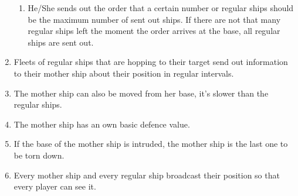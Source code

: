 \begin{enumerate}
\begin{enumerate}[label=\alph*)]
			\item He/She sends out the order that a certain number or regular ships should be the maximum number of sent out ships. If there are not that many regular ships left the moment the order arrives at the base, all regular ships are sent out.
		\end{enumerate}
	\item Fleets of regular ships that are hopping to their target send out information to their mother ship about their position in regular intervals.
	\item The mother ship can also be moved from her base, it's slower than the regular ships.
	\item The mother ship has an own basic defence value.
	\item If the base of the mother ship is intruded, the mother ship is the last one to be torn down.
	\item Every mother ship and every regular ship broadcast their position so that every player can see it.
\end{enumerate}